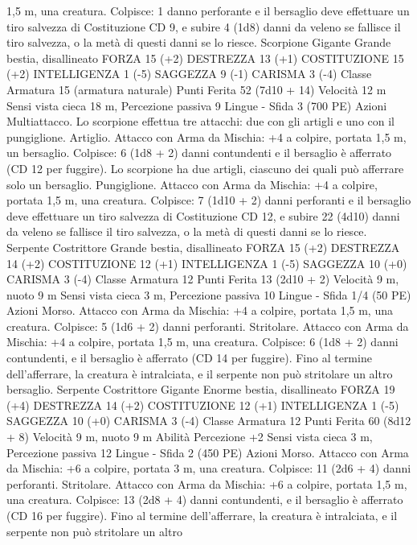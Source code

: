 \begin{multicols}{2}
1,5 m, una creatura.
Colpisce: 1 danno perforante e il bersaglio deve effettuare un tiro
salvezza di Costituzione CD 9, e subire 4 (1d8) danni da veleno
se fallisce il tiro salvezza, o la metà di questi danni se lo riesce.
Scorpione Gigante
Grande bestia, disallineato
FORZA 15 (+2)
DESTREZZA 13 (+1)
COSTITUZIONE 15 (+2)
INTELLIGENZA 1 (-5)
SAGGEZZA 9 (-1)
CARISMA 3 (-4)
Classe Armatura 15 (armatura naturale)
Punti Ferita 52 (7d10 + 14)
Velocità 12 m
Sensi vista cieca 18 m, Percezione passiva 9
Lingue -
Sfida 3 (700 PE)
Azioni
Multiattacco. Lo scorpione effettua tre attacchi: due con gli
artigli e uno con il pungiglione.
Artiglio. Attacco con Arma da Mischia: +4 a colpire, portata 1,5
m, un bersaglio.
Colpisce: 6 (1d8 + 2) danni contundenti e il bersaglio è afferrato
(CD 12 per fuggire). Lo scorpione ha due artigli, ciascuno dei
quali può afferrare solo un bersaglio.
Pungiglione. Attacco con Arma da Mischia: +4 a colpire, portata
1,5 m, una creatura.
Colpisce: 7 (1d10 + 2) danni perforanti e il bersaglio deve
effettuare un tiro salvezza di Costituzione CD 12, e subire 22
(4d10) danni da veleno se fallisce il tiro salvezza, o la metà di
questi danni se lo riesce.
Serpente Costrittore
Grande bestia, disallineato
FORZA 15 (+2)
DESTREZZA 14 (+2)
COSTITUZIONE 12 (+1)
INTELLIGENZA 1 (-5)
SAGGEZZA 10 (+0)
CARISMA 3 (-4)
Classe Armatura 12
Punti Ferita 13 (2d10 + 2)
Velocità 9 m, nuoto 9 m
Sensi vista cieca 3 m, Percezione passiva 10
Lingue -
Sfida 1/4 (50 PE)
Azioni
Morso. Attacco con Arma da Mischia: +4 a colpire, portata 1,5
m, una creatura.
Colpisce: 5 (1d6 + 2) danni perforanti.
Stritolare. Attacco con Arma da Mischia: +4 a colpire, portata
1,5 m, una creatura.
Colpisce: 6 (1d8 + 2) danni contundenti, e il bersaglio è afferrato
(CD 14 per fuggire). Fino al termine dell’afferrare, la creatura è
intralciata, e il serpente non può stritolare un altro bersaglio.
Serpente Costrittore
Gigante
Enorme bestia, disallineato
FORZA 19 (+4)
DESTREZZA 14 (+2)
COSTITUZIONE 12 (+1)
INTELLIGENZA 1 (-5)
SAGGEZZA 10 (+0)
CARISMA 3 (-4)
Classe Armatura 12
Punti Ferita 60 (8d12 + 8)
Velocità 9 m, nuoto 9 m
Abilità Percezione +2
Sensi vista cieca 3 m, Percezione passiva 12
Lingue -
Sfida 2 (450 PE)
Azioni
Morso. Attacco con Arma da Mischia: +6 a colpire, portata 3 m,
una creatura.
Colpisce: 11 (2d6 + 4) danni perforanti.
Stritolare. Attacco con Arma da Mischia: +6 a colpire, portata
1,5 m, una creatura.
Colpisce: 13 (2d8 + 4) danni contundenti, e il bersaglio è
afferrato (CD 16 per fuggire). Fino al termine dell’afferrare, la
creatura è intralciata, e il serpente non può stritolare un altro

\end{multicols}
